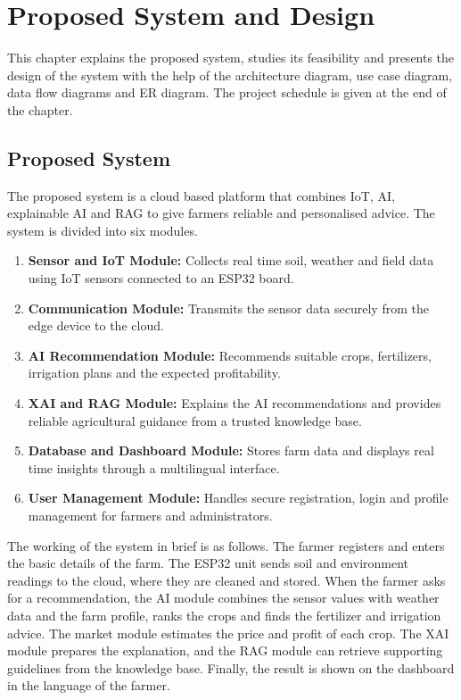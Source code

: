 \chapter{Proposed System and Design}

This chapter explains the proposed system, studies its feasibility and presents the design of the system with the help of the architecture diagram, use case diagram, data flow diagrams and ER diagram. The project schedule is given at the end of the chapter.

\section{Proposed System}
The proposed system is a cloud based platform that combines IoT, AI, explainable AI and RAG to give farmers reliable and personalised advice. The system is divided into six modules.

\begin{enumerate}
  \item \textbf{Sensor and IoT Module:} Collects real time soil, weather and field data using IoT sensors connected to an ESP32 board.
  \item \textbf{Communication Module:} Transmits the sensor data securely from the edge device to the cloud.
  \item \textbf{AI Recommendation Module:} Recommends suitable crops, fertilizers, irrigation plans and the expected profitability.
  \item \textbf{XAI and RAG Module:} Explains the AI recommendations and provides reliable agricultural guidance from a trusted knowledge base.
  \item \textbf{Database and Dashboard Module:} Stores farm data and displays real time insights through a multilingual interface.
  \item \textbf{User Management Module:} Handles secure registration, login and profile management for farmers and administrators.
\end{enumerate}

The working of the system in brief is as follows. The farmer registers and enters the basic details of the farm. The ESP32 unit sends soil and environment readings to the cloud, where they are cleaned and stored. When the farmer asks for a recommendation, the AI module combines the sensor values with weather data and the farm profile, ranks the crops and finds the fertilizer and irrigation advice. The market module estimates the price and profit of each crop. The XAI module prepares the explanation, and the RAG module can retrieve supporting guidelines from the knowledge base. Finally, the result is shown on the dashboard in the language of the farmer.


